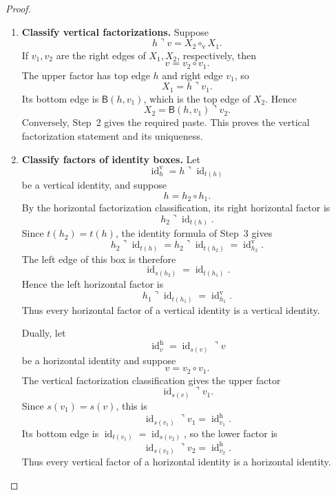 \documentclass[oneside]{article}
\newcommand{\id}{\operatorname{id}}
\newcommand{\trcorner}{\mathbin{\urcorner}}
\newcommand{\bottomedge}[2]{\mathsf{B}(#1,#2)}
\theoremstyle{plain}
\theoremstyle{definition}
\theoremstyle{remark}
\begin{document}
\begin{proof}
\begin{enumerate}[beginpenalty=10000]
        \item \textbf{Classify vertical factorizations.}
        Suppose
        \[
            h\trcorner v
            =
            X_2\circ_{\mathrm v}X_1.
        \]
        If \(v_1,v_2\) are the right edges of \(X_1,X_2\), respectively,
        then
        \[
            v=v_2\circ v_1.
        \]
        The upper factor has top edge \(h\) and right edge \(v_1\), so
        \[
            X_1=h\trcorner v_1.
        \]
        Its bottom edge is \(\bottomedge{h}{v_1}\), which is the top
        edge of \(X_2\). Hence
        \[
            X_2
            =
            \bottomedge{h}{v_1}\trcorner v_2.
        \]
        Conversely, Step~2 gives the required paste. This proves the
        vertical factorization statement and its uniqueness.

        \item \textbf{Classify factors of identity boxes.}
        Let
        \[
            \id_h^{\mathrm v}
            =
            h\trcorner\id_{t(h)}
        \]
        be a vertical identity, and suppose
        \[
            h=h_2\circ h_1.
        \]
        By the horizontal factorization classification, its right
        horizontal factor is
        \[
            h_2\trcorner\id_{t(h)}.
        \]
        Since \(t(h_2)=t(h)\), the identity formula of Step~3 gives
        \[
            h_2\trcorner\id_{t(h)}
            =
            h_2\trcorner\id_{t(h_2)}
            =
            \id_{h_2}^{\mathrm v}.
        \]
        The left edge of this box is therefore
        \[
            \id_{s(h_2)}
            =
            \id_{t(h_1)}.
        \]
        Hence the left horizontal factor is
        \[
            h_1\trcorner\id_{t(h_1)}
            =
            \id_{h_1}^{\mathrm v}.
        \]
        Thus every horizontal factor of a vertical identity is a
        vertical identity.

        Dually, let
        \[
            \id_v^{\mathrm h}
            =
            \id_{s(v)}\trcorner v
        \]
        be a horizontal identity and suppose
        \[
            v=v_2\circ v_1.
        \]
        The vertical factorization classification gives the upper
        factor
        \[
            \id_{s(v)}\trcorner v_1.
        \]
        Since \(s(v_1)=s(v)\), this is
        \[
            \id_{s(v_1)}\trcorner v_1
            =
            \id_{v_1}^{\mathrm h}.
        \]
        Its bottom edge is \(\id_{t(v_1)}=\id_{s(v_2)}\), so the lower
        factor is
        \[
            \id_{s(v_2)}\trcorner v_2
            =
            \id_{v_2}^{\mathrm h}.
        \]
        Thus every vertical factor of a horizontal identity is a
        horizontal identity. \qedhere
    \end{enumerate}
\end{proof}
\end{document}
